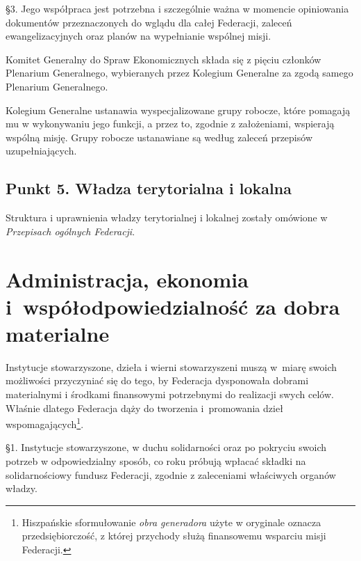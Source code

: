 \S{}3. Jego współpraca jest potrzebna i szczególnie ważna w momencie opiniowania dokumentów przeznaczonych do wglądu dla całej Federacji, zaleceń ewangelizacyjnych oraz planów na wypełnianie wspólnej misji.
 


 Komitet Generalny do Spraw Ekonomicznych składa się z pięciu członków Plenarium Generalnego, wybieranych przez Kolegium Generalne za zgodą samego Plenarium Generalnego.
 


 Kolegium Generalne ustanawia wyspecjalizowane grupy robocze, które pomagają mu w wykonywaniu jego funkcji, a przez to, zgodnie z założeniami, wspierają wspólną misję. Grupy robocze ustanawiane są według zaleceń przepisów uzupełniających.




\section{Punkt 5. Władza terytorialna i lokalna}


 Struktura i uprawnienia władzy terytorialnej i lokalnej zostały omówione w {\em Przepisach ogólnych Federacji}.
 


\chapter{Administracja, ekonomia \mbox{i współodpowiedzialność} za dobra materialne}




 Instytucje stowarzyszone, dzieła i wierni stowarzyszeni muszą \mbox{w miarę} swoich możliwości przyczyniać się do tego, by Federacja dysponowała dobrami materialnymi i środkami finansowymi potrzebnymi do realizacji swych celów. Właśnie dlatego Federacja dąży do tworzenia \mbox{i promowania} dzieł wspomagających\footnote{Hiszpańskie sformułowanie {\em obra generadora} użyte w oryginale oznacza przedsiębiorczość, z której przychody służą finansowemu wsparciu misji Federacji.}.
 


\filbreak{}


 \S{}1. Instytucje stowarzyszone, w duchu solidarności oraz po pokryciu swoich potrzeb w odpowiedzialny sposób, co roku próbują wpłacać składki na solidarnościowy fundusz Federacji, zgodnie z zaleceniami właściwych organów władzy.


